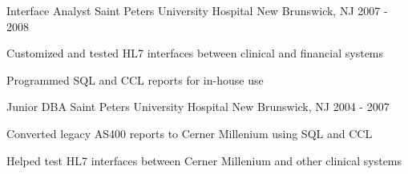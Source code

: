 \begin{cventries}
  \cventry
  {Interface Analyst} %
  {Saint Peters University Hospital} %
  {New Brunswick, NJ} %
  {2007 - 2008} %
  {
    \begin{cvitems} %
      \item {Customized and tested HL7 interfaces between clinical and financial systems}
      \item {Programmed SQL and CCL reports for in-house use}
    \end{cvitems}
  }

  \cventry
    {Junior DBA} %
    {Saint Peters University Hospital} %
    {New Brunswick, NJ} %
    {2004 - 2007} %
    {
      \begin{cvitems} %
        \item {Converted legacy AS400 reports to Cerner Millenium using SQL and CCL}
        \item {Helped test HL7 interfaces between Cerner Millenium and other clinical systems}
      \end{cvitems}
    }

\end{cventries}
